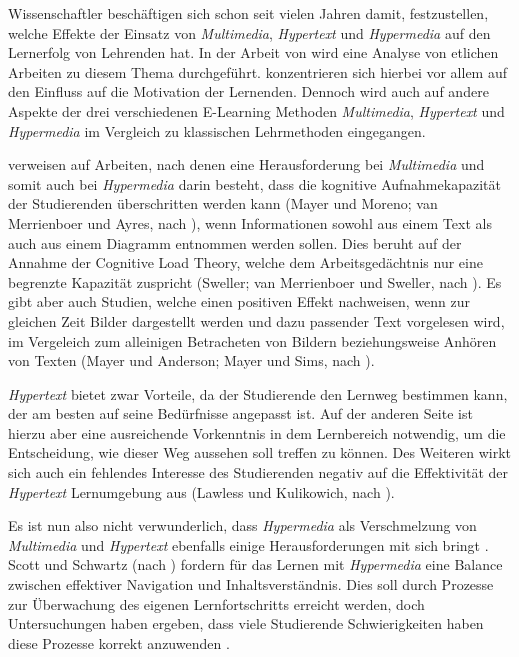 Wissenschaftler beschäftigen sich schon seit vielen Jahren damit, festzustellen, welche Effekte der Einsatz von \textit{Multimedia}, \textit{Hypertext} und \textit{Hypermedia} auf den Lernerfolg von Lehrenden hat. In der Arbeit von \cite{moos2010multimedia} wird eine Analyse von etlichen Arbeiten zu diesem Thema durchgeführt. \cite{moos2010multimedia} konzentrieren sich hierbei vor allem auf den Einfluss auf die Motivation der Lernenden. Dennoch wird auch auf andere Aspekte der drei verschiedenen E-Learning Methoden \textit{Multimedia}, \textit{Hypertext} und  \textit{Hypermedia} im Vergleich zu klassischen Lehrmethoden eingegangen.

\cite{moos2010multimedia} verweisen auf Arbeiten, nach denen eine Herausforderung bei \textit{Multimedia} und somit auch bei \textit{Hypermedia} darin besteht, dass die kognitive Aufnahmekapazität der Studierenden überschritten werden kann (Mayer und Moreno; van Merrienboer und Ayres, nach \cite{moos2010multimedia}), wenn Informationen sowohl aus einem Text als auch aus einem Diagramm entnommen werden sollen. Dies beruht auf der Annahme der Cognitive Load Theory, welche dem Arbeitsgedächtnis nur eine begrenzte Kapazität zuspricht (Sweller; van Merrienboer und Sweller, nach \cite{moos2010multimedia}). Es gibt aber auch Studien, welche einen positiven Effekt nachweisen, wenn zur gleichen Zeit Bilder dargestellt werden und dazu passender Text vorgelesen wird, im Vergeleich zum alleinigen Betracheten von Bildern beziehungsweise Anhören von Texten (Mayer und Anderson; Mayer und Sims, nach \cite{moos2010multimedia}).

\textit{Hypertext} bietet zwar Vorteile, da der Studierende den Lernweg bestimmen kann, der am besten auf seine Bedürfnisse angepasst ist. Auf der anderen Seite ist hierzu aber eine ausreichende Vorkenntnis in dem Lernbereich notwendig, um die Entscheidung, wie dieser Weg aussehen soll treffen zu können. Des Weiteren wirkt sich auch ein fehlendes Interesse des Studierenden negativ auf die Effektivität der \textit{Hypertext} Lernumgebung aus (Lawless und Kulikowich, nach \cite{moos2010multimedia}).

Es ist nun also nicht verwunderlich, dass \textit{Hypermedia} als Verschmelzung von \textit{Multimedia} und \textit{Hypertext} ebenfalls einige Herausforderungen mit sich bringt \citep{moos2010multimedia}. Scott und Schwartz (nach \cite{moos2010multimedia}) fordern für das Lernen mit \textit{Hypermedia} eine Balance zwischen effektiver Navigation und Inhaltsverständnis. Dies soll durch Prozesse zur Überwachung des eigenen Lernfortschritts erreicht werden, doch Untersuchungen haben ergeben, dass viele Studierende Schwierigkeiten haben diese Prozesse korrekt anzuwenden \citep{moos2010multimedia}.

